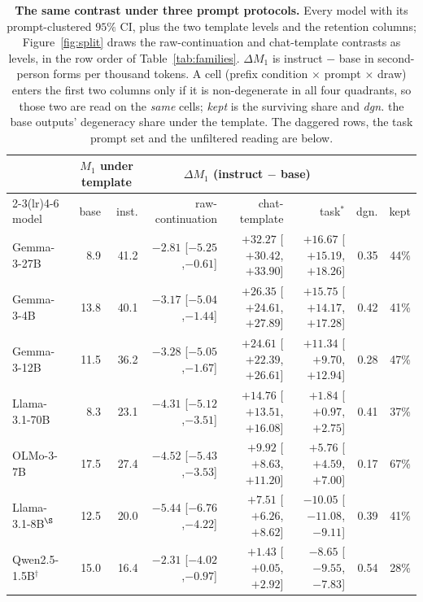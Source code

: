 \begin{table}[t]\centering\scriptsize\setlength{\tabcolsep}{3pt}
\caption{\textbf{The same contrast under three prompt protocols.} Every model with its prompt-clustered $95\%$ CI, plus the two template levels and the retention columns; Figure~\ref{fig:split} draws the raw-continuation and chat-template contrasts as levels, in the row order of Table~\ref{tab:families}. $\Delta M_1$ is instruct $-$ base in second-person forms per thousand tokens. A cell (prefix condition $\times$ prompt $\times$ draw) enters the first two columns only if it is non-degenerate in all four quadrants, so those two are read on the \emph{same} cells; \emph{kept} is the surviving share and \emph{dgn.} the base outputs' degeneracy share under the template. The daggered rows, the task prompt set and the unfiltered reading are below.}\label{tab:twobytwo-full}
\begin{tabular}{l r r r r r r r}
\toprule
 & \multicolumn{2}{c}{$M_1$ under template} & \multicolumn{3}{c}{$\Delta M_1$ (instruct $-$ base)} & & \\
\cmidrule(lr){2-3}\cmidrule(lr){4-6}
model & base & inst. & raw-continuation & chat-template & task$^{\ast}$ & dgn. & kept \\
\midrule
Gemma-3-27B & 8.9 & 41.2 & $-2.81$ {\scriptsize[$-5.25$,$-0.61$]} & $+32.27$ {\scriptsize[$+30.42$,$+33.90$]} & $+16.67$ {\scriptsize[$+15.19$,$+18.26$]} & 0.35 & 44\% \\
Gemma-3-4B & 13.8 & 40.1 & $-3.17$ {\scriptsize[$-5.04$,$-1.44$]} & $+26.35$ {\scriptsize[$+24.61$,$+27.89$]} & $+15.75$ {\scriptsize[$+14.17$,$+17.28$]} & 0.42 & 41\% \\
Gemma-3-12B & 11.5 & 36.2 & $-3.28$ {\scriptsize[$-5.05$,$-1.67$]} & $+24.61$ {\scriptsize[$+22.39$,$+26.61$]} & $+11.34$ {\scriptsize[$+9.70$,$+12.94$]} & 0.28 & 47\% \\
Llama-3.1-70B & 8.3 & 23.1 & $-4.31$ {\scriptsize[$-5.12$,$-3.51$]} & $+14.76$ {\scriptsize[$+13.51$,$+16.08$]} & $+1.84$ {\scriptsize[$+0.97$,$+2.75$]} & 0.41 & 37\% \\
OLMo-3-7B & 17.5 & 27.4 & $-4.52$ {\scriptsize[$-5.43$,$-3.53$]} & $+9.92$ {\scriptsize[$+8.63$,$+11.20$]} & $+5.76$ {\scriptsize[$+4.59$,$+7.00$]} & 0.17 & 67\% \\
Llama-3.1-8B$^{\S}$ & 12.5 & 20.0 & $-5.44$ {\scriptsize[$-6.76$,$-4.22$]} & $+7.51$ {\scriptsize[$+6.26$,$+8.62$]} & $-10.05$ {\scriptsize[$-11.08$,$-9.11$]} & 0.39 & 41\% \\
Qwen2.5-1.5B$^\dagger$ & 15.0 & 16.4 & $-2.31$ {\scriptsize[$-4.02$,$-0.97$]} & $+1.43$ {\scriptsize[$+0.05$,$+2.92$]} & $-8.65$ {\scriptsize[$-9.55$,$-7.83$]} & 0.54 & 28\% \\

\end{tabular}
\end{table}
